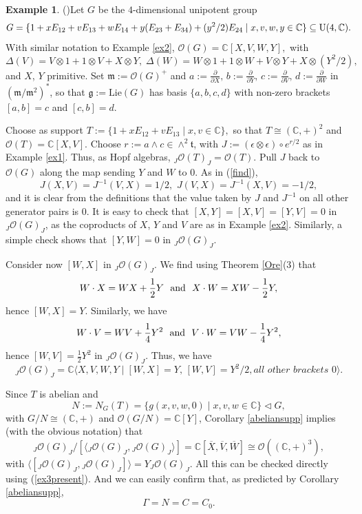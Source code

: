 \documentclass{amsart}
\numberwithin{equation}{section}
\theoremstyle{definition}
\newtheorem{example}[theorem]{Example}
\begin{document}
\begin{example}(\cite[Example 6.2]{G2})\label{ex3} 
Let $G$ be the $4$-dimensional unipotent group
$$ G = \{1 + xE_{12} + vE_{13} + wE_{14} + y(E_{23}+E_{34}) + (y^2/2)E_{24} \mid x,v,w,y \in \mathbb{C} \} \subseteq {\rm U}(4,\mathbb{C}).$$
With similar notation to Example \ref{ex2}, $\mathcal{O}(G)  = \mathbb{C}[X,V,W,Y],$ with 
$$ \Delta (V)  =  V \otimes 1 + 1 \otimes V + X \otimes Y, \; \Delta (W)  = W \otimes 1 + 1 \otimes W + V \otimes Y + X \otimes (Y^2/2),$$
and $X$, $Y$ primitive. Set $\mathfrak{m} := \mathcal{O}(G)^+$ and $ a := \frac{\partial}{\partial X} , \, b :=\frac{\partial}{\partial Y} , \, c := \frac{\partial}{\partial V}, \, d := \frac{\partial}{\partial W}$ in $(\mathfrak{m}/\mathfrak{m}^2)^{\ast}$, so that $\mathfrak{g} := \mathrm{Lie}(G)$ has basis $\{a,b,c,d\}$ with non-zero brackets  $[a,b] = c$ and $[c,b] = d$.

Choose as support $T:= \{1 + xE_{12} + vE_{13} \mid x,v \in \mathbb{C}\},$ so that $T \cong (\mathbb{C},+)^2$ and $\mathcal{O}(T) = \mathbb{C}[X,V]$. Choose $r := a\wedge c \in \wedge^2 \mathfrak{t}$, with $J := (\epsilon \otimes \epsilon)\circ e^{r/2}$ as in Example \ref{ex1}. Thus, as Hopf algebras, $_J\mathcal{O}(T)_J = \mathcal{O}(T).$
Pull $J$ back to $\mathcal{O}(G)$ along the map sending $Y$ and $W$ to $0$. As in (\ref{find}),
$$ J(X,V) = J^{-1}(V,X) = 1/2,\,\, J(V,X) = J^{-1}(X,V) = -1/2,$$
and it is clear from the definitions that the value taken by $J$ and $J^{-1}$ on all other generator pairs is 0. It is easy to check that $[X,Y] = [X,V] = [Y,V] = 0$
in ${}_J\mathcal{O}(G)_J$, as the coproducts of $X$, $Y$ and $V$ are as in Example \ref{ex2}. Similarly, a simple check shows that $[Y,W] = 0$ in ${}_J\mathcal{O}(G)_J$. 

Consider now $[W,X]$ in ${}_J\mathcal{O}(G)_J$. We find using Theorem \ref{Ore}(3) that 
$$W \cdot X = WX + \frac{1}{2} Y\,\,\,\,{\rm and}\,\,\,\, X \cdot W =  XW - \frac{1}{2}Y,$$ hence $ [W,X] = Y$. Similarly, we have
$$W \cdot V = WV + \frac{1}{4} Y^2\,\,\,\,{\rm and}\,\,\,\, V \cdot W = VW - \frac{1}{4} Y^2,$$ hence $ [W,V] = \frac{1}{2} Y^2 $ in ${}_J\mathcal{O}(G)_J$. Thus, we have
\begin{equation}\label{ex3present}{}_J \mathcal{O}(G)_J=\mathbb{C}\langle X,V,W,Y \mid [W,X]=Y,\,[W,V] = Y^2/2, \textit{all other brackets $0$}\rangle.
\end{equation}

Since $T$ is abelian and  
$$ N := N_G(T) = \{ g(x,v,w,0)\mid x,v,w \in \mathbb{C} \} \lhd G, $$
with $G/N \cong (\mathbb{C},+)$ and $\mathcal{O}(G/N) = \mathbb{C}[Y]$, Corollary \ref{abeliansupp} implies (with the obvious notation) that
$$ {}_J\mathcal{O}(G)_J/[\langle {}_J\mathcal{O}(G)_J,{}_J\mathcal{O}(G)_J \rangle] = \mathbb{C}[\overline{X},\overline{V},\overline{W}] \cong \mathcal{O}((\mathbb{C},+)^3),$$
with $\langle [{}_J\mathcal{O}(G)_J,{}_J\mathcal{O}(G)_J ]\rangle = Y{}_J\mathcal{O}(G)_J$. All this can be checked directly using (\ref{ex3present}). And we can easily confirm that, as predicted by Corollary \ref{abeliansupp},
$$ \Gamma = N = C = C_0.$$


\end{example}
\end{document}
